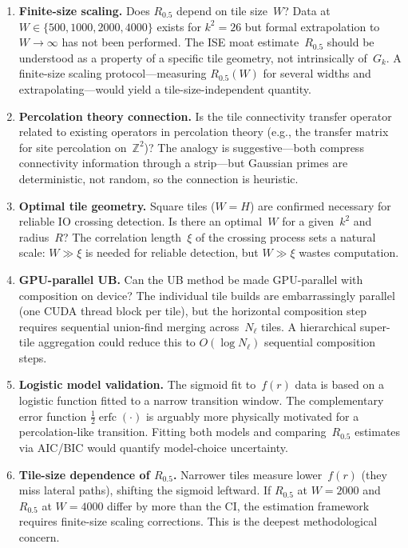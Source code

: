 \documentclass[11pt,a4paper]{article}
\newcommand{\Gk}{G_k}
\newcommand{\fr}{f(r)}
\newcommand{\Rhalf}{R_{0.5}}
\theoremstyle{definition}
\theoremstyle{plain}
\theoremstyle{remark}
\begin{document}
\begin{enumerate}
  \item \textbf{Finite-size scaling.}  Does $\Rhalf$ depend on tile size~$W$?  Data at $W \in \{500, 1000, 2000, 4000\}$ exists for $k^2 = 26$ but formal extrapolation to $W \to \infty$ has not been performed.  The ISE moat estimate~$\Rhalf$ should be understood as a property of a specific tile geometry, not intrinsically of~$\Gk$.  A finite-size scaling protocol---measuring $\Rhalf(W)$ for several widths and extrapolating---would yield a tile-size-independent quantity.

  \item \textbf{Percolation theory connection.}  Is the tile connectivity transfer operator related to existing operators in percolation theory (e.g., the transfer matrix for site percolation on~$\mathbb{Z}^2$)?  The analogy is suggestive---both compress connectivity information through a strip---but Gaussian primes are deterministic, not random, so the connection is heuristic.

  \item \textbf{Optimal tile geometry.}  Square tiles ($W = H$) are confirmed necessary for reliable IO crossing detection.  Is there an optimal~$W$ for a given~$k^2$ and radius~$R$?  The correlation length~$\xi$ of the crossing process sets a natural scale: $W \gg \xi$ is needed for reliable detection, but $W \gg \xi$ wastes computation.

  \item \textbf{GPU-parallel UB.}  Can the UB method be made GPU-parallel with composition on device?  The individual tile builds are embarrassingly parallel (one CUDA thread block per tile), but the horizontal composition step requires sequential union-find merging across~$N_\ell$ tiles.  A hierarchical super-tile aggregation could reduce this to $O(\log N_\ell)$ sequential composition steps.

  \item \textbf{Logistic model validation.}  The sigmoid fit to~$\fr$ data is based on a logistic function fitted to a narrow transition window.  The complementary error function $\tfrac{1}{2}\operatorname{erfc}(\cdot)$ is arguably more physically motivated for a percolation-like transition.  Fitting both models and comparing~$\Rhalf$ estimates via AIC/BIC would quantify model-choice uncertainty.

  \item \textbf{Tile-size dependence of $\Rhalf$.}  Narrower tiles measure lower~$\fr$ (they miss lateral paths), shifting the sigmoid leftward.  If $\Rhalf$ at $W = 2000$ and $\Rhalf$ at $W = 4000$ differ by more than the CI, the estimation framework requires finite-size scaling corrections.  This is the deepest methodological concern.
\end{enumerate}
\end{document}
